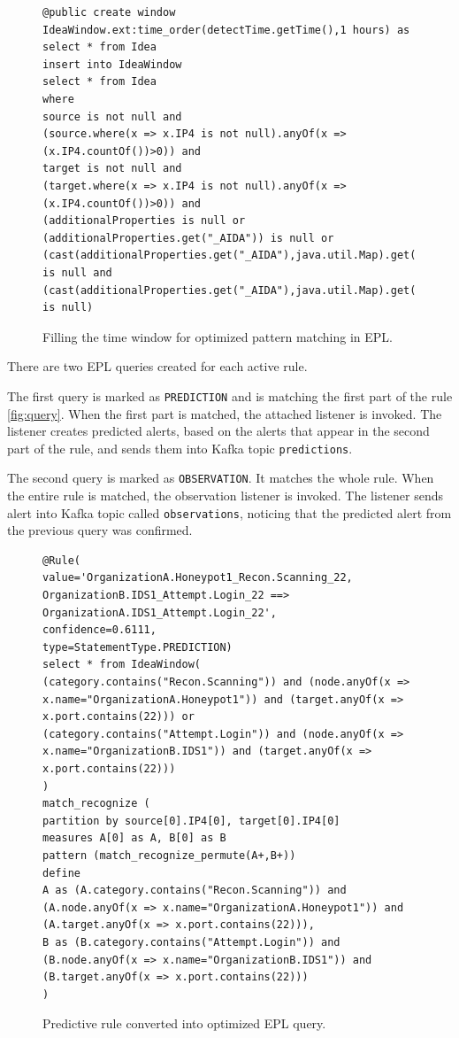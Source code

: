 \documentclass[a4paper]{article} %
\begin{document}
\begin{figure}[h!]
\begin{lstlisting}[]
@public create window IdeaWindow.ext:time_order(detectTime.getTime(),1 hours) as select * from Idea
insert into IdeaWindow
select * from Idea
where
source is not null and
(source.where(x => x.IP4 is not null).anyOf(x => (x.IP4.countOf())>0)) and
target is not null and
(target.where(x => x.IP4 is not null).anyOf(x => (x.IP4.countOf())>0)) and
(additionalProperties is null or (additionalProperties.get("_AIDA")) is null or
(cast(additionalProperties.get("_AIDA"),java.util.Map).get("Duplicate")) is null and
(cast(additionalProperties.get("_AIDA"),java.util.Map).get("Continuing")) is null)
\end{lstlisting}
\caption{Filling the time window for optimized pattern matching in EPL.}
\label{fig:twfill}
\end{figure}

There are two EPL queries created for each active rule.

The first query is marked as \texttt{PREDICTION} and is matching the first part of the rule \autoref{fig:query}. When the first part is matched, the attached listener is invoked. The listener creates predicted alerts, based on the alerts that appear in the second part of the rule, and sends them into Kafka topic \texttt{predictions}.

The second query is marked as \texttt{OBSERVATION}. It matches the whole rule. When the entire rule is matched, the observation listener is invoked. The listener sends alert into Kafka topic called \texttt{observations}, noticing that the predicted alert from the previous query was confirmed.

\begin{figure}[h!]
\begin{lstlisting}[]
@Rule(
value='OrganizationA.Honeypot1_Recon.Scanning_22, OrganizationB.IDS1_Attempt.Login_22 ==> OrganizationA.IDS1_Attempt.Login_22',
confidence=0.6111,
type=StatementType.PREDICTION)
select * from IdeaWindow(
(category.contains("Recon.Scanning")) and (node.anyOf(x => x.name="OrganizationA.Honeypot1")) and (target.anyOf(x => x.port.contains(22))) or
(category.contains("Attempt.Login")) and (node.anyOf(x => x.name="OrganizationB.IDS1")) and (target.anyOf(x => x.port.contains(22)))
)
match_recognize (
partition by source[0].IP4[0], target[0].IP4[0]
measures A[0] as A, B[0] as B
pattern (match_recognize_permute(A+,B+))
define
A as (A.category.contains("Recon.Scanning")) and (A.node.anyOf(x => x.name="OrganizationA.Honeypot1")) and (A.target.anyOf(x => x.port.contains(22))),
B as (B.category.contains("Attempt.Login")) and (B.node.anyOf(x => x.name="OrganizationB.IDS1")) and (B.target.anyOf(x => x.port.contains(22)))
)
\end{lstlisting}
\caption{Predictive rule converted into optimized EPL query.}
\label{fig:query}
\end{figure}
\end{document}
